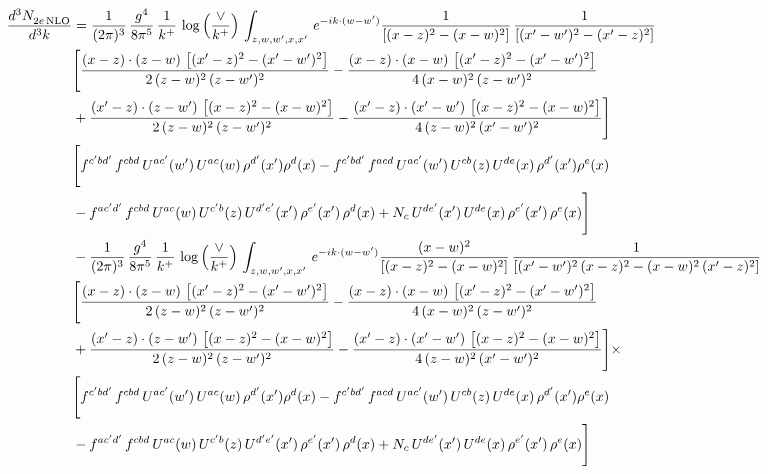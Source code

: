 \documentclass[9pt]{article}
\numberwithin{equation}{section}
\begin{document}
\begin{align}
 \frac{d^{3}N_{2e\,\rm NLO}^{\rm}}{d^{3}k}  & =  \frac{1}{(2\pi)^{3}}\, \frac{g^{4}}{8\pi^{5}}\,\frac{1}{k^{+}}\,\log{\left(\frac{\vee}{k^{+}}\right)}\,\int_{z,w,w^{\prime},x,x'}\, e^{-ik\cdot (w-w')} \frac{1}{\left[(x-z)^{2}-(x-w)^{2}\right]}\, \frac{1}{\left[(x'-w')^{2} - (x'-z)^{2}\right]} \notag \\ & \Bigg[\frac{(x-z)\cdot (z-w)\, \left[(x'-z)^{2}-(x'-w')^{2}\right]}{2\, (z-w)^{2}\, (z-w')^{2}}  - \frac{(x-z)\cdot (x-w)\,\left[(x'-z)^{2}-(x'-w')^{2}\right] }{4\,(x-w)^{2}\,(z-w')^{2}}\notag \\ & +\frac{(x'-z)\cdot (z-w')\, \left[(x-z)^{2}-(x-w)^{2}\right]}{2\, (z-w)^{2}\, (z-w')^{2}}-\frac{(x'-z)\cdot (x'-w')\, \left[(x-z)^{2}-(x-w)^{2}\right]}{4\, (z-w)^{2}\,(x'-w')^{2}}\Bigg]\notag \\ & \Bigg[f^{c'bd'}\,f^{cbd}\, U^{ac'}(w')\,U^{ac}(w)\,\rho^{d'}(x')\rho^{d}(x)- f^{c'bd'}\,f^{acd}\,U^{ac'}(w')\,U^{cb}(z)\,U^{de}(x)\,\rho^{d'}(x')\rho^{e}(x) \notag \\ & -f^{ac'd'}\,f^{cbd}\,U^{ac}(w)\,U^{c'b}(z)\,U^{d'e'}(x')\,\rho^{e'}(x')\,\rho^{d}(x) +N_{c}\,U^{de'}(x')\,U^{de}(x)\,\rho^{e'}(x')\,\rho^{e}(x)\Bigg] \notag \\ & -\frac{1}{(2\pi)^{3}}\, \frac{g^{4}}{8\pi^{5}}\,\frac{1}{k^{+}}\,\log{\left(\frac{\vee}{k^{+}}\right)}\,\int_{z,w,w^{\prime},x,x'}\, e^{-ik\cdot (w-w')}\frac{(x-w)^{2}}{\left[(x-z)^{2}-(x-w)^{2}\right]}\, \frac{1}{\left[(x'-w')^{2}\, (x-z)^{2} - (x-w)^{2}\, (x'-z)^{2}\right]} \notag \\ & \Bigg[\frac{(x-z)\cdot (z-w)\, \left[(x'-z)^{2}-(x'-w')^{2}\right]}{2\, (z-w)^{2}\, (z-w')^{2}}  - \frac{(x-z)\cdot (x-w)\,\left[(x'-z)^{2}-(x'-w')^{2}\right] }{4\,(x-w)^{2}\,(z-w')^{2}}\notag \\ & +\frac{(x'-z)\cdot (z-w')\, \left[(x-z)^{2}-(x-w)^{2}\right]}{2\, (z-w)^{2}\, (z-w')^{2}}-\frac{(x'-z)\cdot (x'-w')\, \left[(x-z)^{2}-(x-w)^{2}\right]}{4\, (z-w)^{2}\,(x'-w')^{2}}\Bigg]\times\,\notag \\ & \Bigg[f^{c'bd'}\,f^{cbd}\, U^{ac'}(w')\,U^{ac}(w)\,\rho^{d'}(x')\rho^{d}(x)- f^{c'bd'}\,f^{acd}\,U^{ac'}(w')\,U^{cb}(z)\,U^{de}(x)\,\rho^{d'}(x')\rho^{e}(x) \notag \\ & -f^{ac'd'}\,f^{cbd}\,U^{ac}(w)\,U^{c'b}(z)\,U^{d'e'}(x')\,\rho^{e'}(x')\,\rho^{d}(x) +N_{c}\,U^{de'}(x')\,U^{de}(x)\,\rho^{e'}(x')\,\rho^{e}(x)\Bigg] \notag \\

\end{align}
\end{document}
